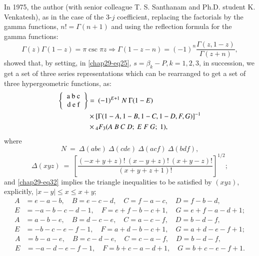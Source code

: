 In 1975, the author (with senior colleague T. S. Santhanam and Ph.D. student K. Venkatesh), as in the case of the 3-$j$ coefficient, replacing the factorials by the gamma functions, $n! = \Gamma(n+1)$ and using the reflection formula for the gamma functions:
\begin{equation}
\Gamma(z)\Gamma(1-z) = \pi \csc \pi z \Rightarrow \Gamma(1-z-n)=(-1)^n \frac{\Gamma(z, 1-z)}{\Gamma(z+n)}, \label{chap29-eq29}
\end{equation}
showed that, by setting, in \eqref{chap29-eq25}, $s=\beta_k-P, k=1,2,3$, in succession, we get a set of three series representations which can be rearranged to get a set of three hypergeometric functions, as:
\begin{equation}
\begin{split}
\left\{ 
\begin{tabular} {c} 
a\ b\ c\\ d\ e\ f \\ \end{tabular} 
\right\} 
& =\ (-1)^{E+1}\ N\ \Gamma(1-E)\\
& \times [\Gamma(1-A, 1-B, 1-C, 1-D, F, G)]^{-1}\\
& \times {}_4F_3(A\ B\ C\ D;\ E\ F\ G;\ 1), \label{chap29-eq30}
\end{split}
\end{equation}
where
\begin{equation}
N\ =\ \Delta(abe)\ \Delta(cde)\ \Delta(acf)\ \Delta(bdf), \label{chap29-eq31}
\end{equation}
\begin{equation}
\Delta(xyz)\ =\  \left[ \frac{(-x+y+z)!\ (x-y+z)!\ (x+y-z)!}{(x+y+z+1)!} \right]^{1/2}; \label{chap29-eq32}
\end{equation}
and \eqref{chap29-eq32} implies the triangle inequalities to be satisfied by $(xyz)$, explicitly, $|x-y| \leq x \leq x+y$; 
{\fontsize{9.5pt}{11pt}\selectfont
\begin{equation}
\begin{split}
A & = e-a-b, \quad B=e-c-d, \quad C=f-a-c, \quad D=f-b-d,\\
E & = -a-b-c-d-1, \quad F=e+f-b-c+1, \quad G=e+f-a-d+1;\label{chap29-eq33}
\end{split}
\end{equation}
\begin{equation}
\begin{split}
A & = a-b-e, \quad B=d-c-e, \quad C=a-c-f, \quad D=b-d-f,\\
E & = -b-c-e-f-1, \quad F=a+d-b-c+1, \quad G=a+d-e-f+1; \label{chap29-eq34}
\end{split}
\end{equation}
\begin{equation}
\begin{split}
A & = b-a-e, \quad B=c-d-e, \quad C=c-a-f, \quad D=b-d-f,\\
E & = -a-d-e-f-1, \quad F=b+c-a-d+1, \quad G=b+c-e-f+1. \label{chap29-eq35}
\end{split}
\end{equation}}\relax

